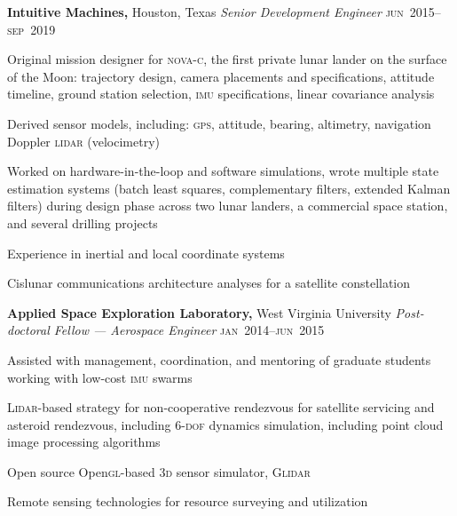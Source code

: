 \documentclass[12pt,letterpaper]{article}
\newenvironment{itemize*}%
{\begin{itemize}%
  \setlength{\itemsep}{0pt}}%
{\end{itemize}}
\newcommand{\mhead}[1]{\leavevmode\marginpar{\sffamily\footnotesize #1}}
\newcommand{\rdate}[1]{{\hfill #1}}
\begin{document}
{\medskip
\textbf{Intuitive Machines,} Houston, Texas \newline
\emph{Senior Development Engineer} \rdate{\textsc{jun}~2015--\textsc{sep}~2019} %
\begin{itemize*}
  \item Original mission designer for \textsc{nova-c}, the first private lunar lander on the surface of the Moon: trajectory design, camera placements and specifications, attitude timeline, ground station selection, \textsc{imu} specifications, linear covariance analysis
  \item Derived sensor models, including: \textsc{gps}, attitude, bearing, altimetry, navigation Doppler \textsc{lidar} (velocimetry)
  \item Worked on hardware-in-the-loop and software simulations, wrote multiple state estimation systems (batch least squares, complementary filters, extended Kalman filters) during design phase across two lunar landers, a commercial space station, and several drilling projects
  \item Experience in inertial and local coordinate systems
  \item Cislunar communications architecture analyses for a satellite constellation
\end{itemize*}

\bigskip
\mhead{Academic \newline Appointments}%
\textbf{Applied Space Exploration Laboratory,} West Virginia University \newline
\emph{Post-doctoral Fellow --- Aerospace Engineer} \rdate{\textsc{jan}~2014--\textsc{jun}~2015}
\begin{itemize*}
  \item Assisted with management, coordination, and mentoring of graduate students working with low-cost \textsc{imu} swarms
  \item \textsc{Lidar}-based strategy for non-cooperative rendezvous for satellite servicing and asteroid rendezvous, including 6-\textsc{dof} dynamics simulation, including point cloud image processing algorithms
  \item Open source Open\textsc{gl}-based \textsc{3d} sensor simulator, \textsc{Glidar}
  \item Remote sensing technologies for resource surveying and utilization
\end{itemize*}

}
\end{document}
